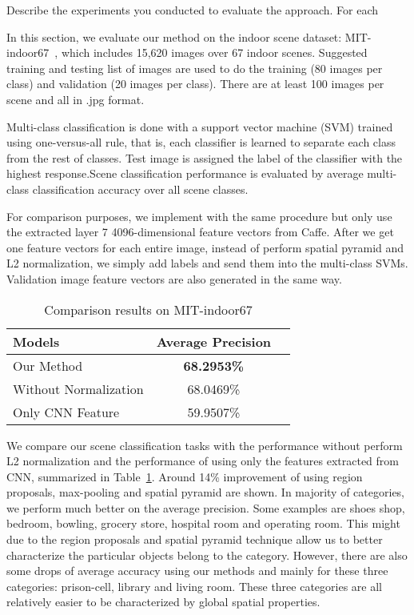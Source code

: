 Describe the experiments you conducted to evaluate the approach.  For each

In this section, we evaluate our method on the indoor scene dataset:
MIT-indoor67~\cite{Quattoni:2009:RIS},
which includes 15,620 images over 67 indoor scenes. Suggested training and
testing list of images are used to do the training (80 images per class)
and validation (20 images per class). There are at least 100 images per
scene and all in .jpg format.

Multi-class classification is done with a support vector machine (SVM) trained
using one-versus-all rule, that is, each classifier is learned to separate each
class from the rest of classes. Test image is assigned the label of the
classifier with the highest response.Scene classification performance is
evaluated by average multi-class classification accuracy over all scene classes.

For comparison purposes, we implement with the same procedure but only use
the extracted layer 7 4096-dimensional feature vectors from Caffe. After we get
one feature vectors for each entire image, instead of perform spatial pyramid
and L2 normalization, we simply add labels and send them into the multi-class
SVMs. Validation image feature vectors are also generated in the same way.

\begin{table}[ht]
	\caption{Comparison results on MIT-indoor67}
	\centering
	\begin{tabular}{l c c}
	\hline \hline
	Models                & Average Precision \\ \hline
	Our Method  	      & {\bf{68.2953\%}} \\
	Without Normalization & 68.0469\% \\
        Only CNN Feature      & 59.9507\% \\
	\hline
	\end{tabular}
	\label{tab:overall}
\end{table}

We compare our scene classification tasks with the performance without perform
L2 normalization and the performance of using only the features extracted from
CNN, summarized in Table~\ref{tab:overall}. Around 14\% improvement of using
region proposals, max-pooling and spatial pyramid are shown. In majority of
categories, we perform much better on the average precision. Some examples
are shoes shop, bedroom, bowling, grocery store, hospital room and operating
room. This might due to the region proposals and spatial pyramid technique
allow us to better characterize the particular objects belong to the category.
However, there are also some drops of average accuracy using our methods and
mainly for these three categories: prison-cell, library and living room. These
three categories are all relatively easier to be characterized by global
spatial properties.

